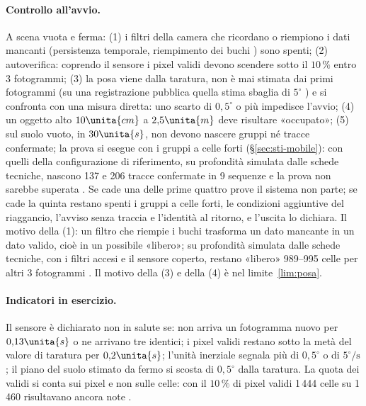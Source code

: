 \paragraph{Controllo all'avvio.} A scena vuota e ferma: (1) i filtri della camera che ricordano o riempiono i dati mancanti (persistenza temporale, riempimento dei buchi \cite{realsense-filtri-post}) sono spenti; (2) autoverifica: coprendo il sensore i pixel validi devono scendere sotto il $10\,\%$ entro 3 fotogrammi; (3) la posa viene dalla taratura, non è mai stimata dai primi fotogrammi (su una registrazione pubblica \cite{tum-rgbd} quella stima sbaglia di $5^\circ$ ) e si confronta con una misura diretta: uno scarto di $0{,}5^\circ$ o più impedisce l'avvio; (4) un oggetto alto $10\unita{cm}$ a $2{,}5\unita{m}$ deve risultare «occupato»; (5) sul suolo vuoto, in $30\unita{s}$, non devono nascere gruppi né tracce confermate; la prova si esegue con i gruppi a celle forti (\S\ref{sec:sti-mobile}): con quelli della configurazione di riferimento, su profondità simulata dalle schede tecniche, nascono 137 e 206 tracce confermate in 9 sequenze e la prova non sarebbe superata . Se cade una delle prime quattro prove il sistema non parte; se cade la quinta restano spenti i gruppi a celle forti, le condizioni aggiuntive del riaggancio, l'avviso senza traccia e l'identità al ritorno, e l'uscita lo dichiara. Il motivo della (1): un filtro che riempie i buchi trasforma un dato mancante in un dato valido, cioè in un possibile «libero»; su profondità simulata dalle schede tecniche, con i filtri accesi e il sensore coperto, restano «libero» 989--995 celle per altri 3 fotogrammi . Il motivo della (3) e della (4) è nel limite~\ref{lim:posa}.

\paragraph{Indicatori in esercizio.} Il sensore è dichiarato non in salute se: non arriva un fotogramma nuovo per $0{,}13\unita{s}$ o ne arrivano tre identici; i pixel validi restano sotto la metà del valore di taratura per $0{,}2\unita{s}$; l'unità inerziale segnala più di $0{,}5^\circ$ o di $5^\circ/\mathrm{s}$; il piano del suolo stimato da fermo si scosta di $0{,}5^\circ$ dalla taratura. La quota dei validi si conta sui pixel e non sulle celle: con il $10\,\%$ di pixel validi 1\,444 celle su 1\,460 risultavano ancora note .

